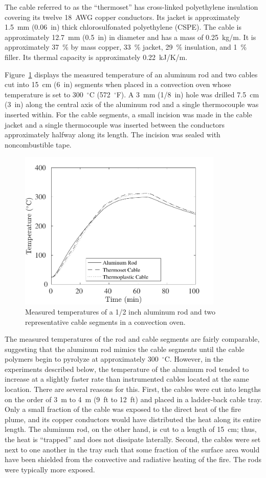 The cable referred to as the ``thermoset'' has cross-linked polyethylene insulation covering its twelve 18~AWG copper conductors. Its jacket is approximately 1.5~mm (0.06~in) thick chlorosulfonated polyethylene (CSPE). The cable is approximately 12.7~mm (0.5~in) in diameter and has a mass of 0.25~kg/m. It is approximately 37~\% by mass copper, 33~\% jacket, 29~\% insulation, and 1~\% filler. Its thermal capacity is approximately 0.22~kJ/K/m.

Figure~\ref{oven} displays the measured temperature of an aluminum rod and two cables cut into 15~cm (6~in) segments when placed in a convection oven whose temperature is set to 300~$^\circ$C (572~$^\circ$F). A 3~mm (1/8~in) hole was drilled 7.5~cm (3~in) along the central axis of the aluminum rod and a single thermocouple was inserted within. For the cable segments, a small incision was made in the cable jacket and a single thermocouple was inserted between the conductors approximately halfway along its length. The incision was sealed with noncombustible tape.

\begin{figure}[!ht]
\centering
\includegraphics[height=3.0in]{../SCRIPT_FIGURES/Oven_Test}
\caption[Temperatures of cables and aluminum rod in convective oven]{Measured temperatures of a 1/2 inch aluminum rod and two representative cable segments in a convection oven.}
\label{oven}
\end{figure}

The measured temperatures of the rod and cable segments are fairly comparable, suggesting that the aluminum rod mimics the cable segments until the cable polymers begin to pyrolyze at approximately 300~$^\circ$C. However, in the experiments described below, the temperature of the aluminum rod tended to increase at a slightly faster rate than instrumented cables located at the same location. There are several reasons for this. First, the cables were cut into lengths on the order of 3~m to 4~m (9~ft to 12~ft) and placed in a ladder-back cable tray. Only a small fraction of the cable was exposed to the direct heat of the fire plume, and its copper conductors would have distributed the heat along its entire length. The aluminum rod, on the other hand, is cut to a length of 15~cm; thus, the heat is ``trapped'' and does not dissipate laterally. Second, the cables were set next to one another in the tray such that some fraction of the surface area would have been shielded from the convective and radiative heating of the fire. The rods were typically more exposed.

